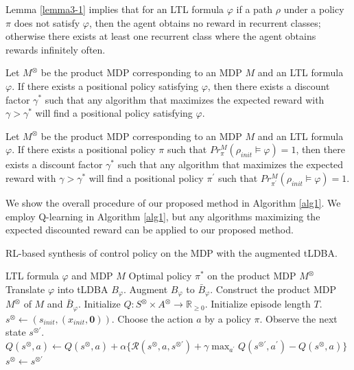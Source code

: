 \documentclass[a4j,12pt,oneside,openany,english,dvipdfmx]{jsbook}
\begin{document}
Lemma \ref{lemma3-1} implies that for an LTL formula $\varphi$ if a path $\rho$ under a policy $\pi$ does not satisfy $\varphi$, then the agent obtains no reward in recurrent classes; otherwise there exists at least one recurrent class where the agent obtains rewards infinitely often.

\begin{theorem}
  Let $M^{\otimes}$ be the product MDP corresponding to an MDP $M$ and an LTL formula $\varphi$. If there exists a positional policy satisfying $\varphi$, then there exists a discount factor $\gamma^{\ast}$ such that any algorithm that maximizes the expected reward with $\gamma > \gamma^{\ast}$ will find a positional policy satisfying $\varphi$.
  \label{theorem3-1}
\end{theorem}

\begin{theorem}
  Let $M^{\otimes}$ be the product MDP corresponding to an MDP $M$ and an LTL formula $\varphi$. If there exists a positional policy $\pi$ such that $Pr^M_{\pi}(\rho_{init} \models \varphi) = 1$, then there exists a discount factor $\gamma^{\ast}$ such that any algorithm that maximizes the expected reward with $\gamma > \gamma^{\ast}$ will find a positional policy $\pi^{\prime}$ such that $Pr^M_{\pi^{\prime}}(\rho_{init} \models \varphi) = 1$.
  \label{theorem3-2}
\end{theorem}

We show the overall procedure of our proposed method in Algorithm \ref{alg1}. We employ Q-learning in Algorithm \ref{alg1}, but any algorithms maximizing the expected discounted reward can be applied to our proposed method.
\begin{algorithm}
 \caption{RL-based synthesis of control policy on the MDP with the augmented tLDBA.}
 \begin{algorithmic}[1]
 \renewcommand{\algorithmicrequire}{\textbf{Input:}}
 \renewcommand{\algorithmicensure}{\textbf{Output:}}
 \REQUIRE LTL formula $\varphi$ and MDP $M$
 \ENSURE  Optimal policy $\pi^{\ast}$ on the product MDP $M^{\otimes}$
 \STATE Translate $\varphi$ into tLDBA $B_{\varphi}$.
  \STATE Augment $B_{\varphi}$ to $\bar{B}_{\varphi}$.
  \STATE Construct the product MDP $M^{\otimes}$ of $M$ and $\bar{B}_{\varphi}$.
  \STATE Initialize $Q:S^{\otimes} \times A^{\otimes} \rightarrow \mathbb{R}_{\geq 0}$.
  \STATE Initialize episode length $T$.
  \STATE $s^{\otimes} \leftarrow (s_{init},(x_{init},\bm{0}))$.
  \STATE Choose the action $a$ by a policy $\pi$.
  \STATE Observe the next state $s^{\otimes \prime}$.
  \STATE $Q(s^{\otimes},a) \leftarrow Q(s^{\otimes},a) + \alpha \{ \mathcal{R}(s^{\otimes},a,s^{\otimes \prime}) + \gamma \max_{a^{\prime}}Q(s^{\otimes \prime},a^{\prime}) - Q(s^{\otimes},a) \}$
  \STATE $s^{\otimes} \leftarrow s^{\otimes \prime}$
  \ENDFOR
  \ENDWHILE
 \end{algorithmic}
 \label{alg1}
 \end{algorithm}
\end{document}
